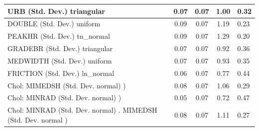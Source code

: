 \begin{table}
\begin{center}
\begin{tabular}{|l|l|c|c|c|l|}
			\hline
			URB (Std. Dev.) triangular &  & 0.07 & 0.07 & 1.00 & 0.32 \\
			\hline
			DOUBLE (Std. Dev.) uniform &  & 0.09 & 0.07 & 1.19 & 0.23 \\
			\hline
			PEAKHR (Std. Dev.) tn_normal &  & 0.09 & 0.07 & 1.29 & 0.20 \\
			\hline
			GRADEBR (Std. Dev.) triangular &  & 0.07 & 0.07 & 0.92 & 0.36 \\
			\hline
			MEDWIDTH (Std. Dev.) uniform &  & 0.07 & 0.07 & 0.93 & 0.35 \\
			\hline
			FRICTION (Std. Dev.) ln_normal &  & 0.06 & 0.07 & 0.77 & 0.44 \\
			\hline
			 Chol: MIMEDSH (Std. Dev. normal) ) &  & 0.08 & 0.07 & 1.06 & 0.29 \\
			\hline
			 Chol: MINRAD (Std. Dev. normal) ) &  & 0.05 & 0.07 & 0.72 & 0.47 \\
			\hline
			 Chol: MINRAD (Std. Dev. normal) . MIMEDSH (Std. Dev.   normal ) &  & 0.08 & 0.07 & 1.11 & 0.27 \\
			\hline
		\end{tabular}
	\end{center}
\end{table}